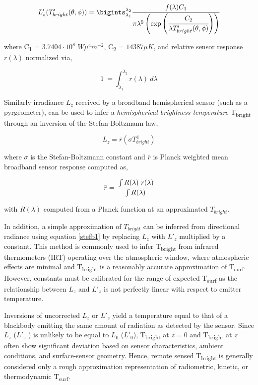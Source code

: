 \begin{equation}
L'_z(T'_{bright} (\theta, \phi)) = \bigints_{\lambda_1}^{\lambda_2} \cfrac{f(\lambda) C_1}{\pi \lambda^5 \left( \exp\left(\cfrac{C_2}{\lambda T'_{bright} (\theta, \phi)}\right)\right)}
\end{equation}

\noindent where C\textsubscript{1} = $ 3.7404 \cdot 10^8 $ $ W\mu^4 m^{-2} $, C\textsubscript{2} = $ 14387 \mu K $, and relative sensor response $ r(\lambda) $ normalized via,

\begin{equation}
1 ~ =  \int_{\lambda_1}^{\lambda_2} r(\lambda) ~ d\lambda
\end{equation}

Similarly irradiance $L_z$ received by a broadband hemispherical sensor (such as a pyrgeometer), can be used to infer a \textit{hemispherical brightness temperature} T\textsubscript{bright} through an inversion of the Stefan-Boltzmann law,

\begin{equation}
\label{stefb1}
L_z = \overline{r} (\sigma T_{bright}^4)
\end{equation}

\noindent where $ \sigma $ is the Stefan-Boltzmann constant and $ \overline{r} $ is Planck weighted mean broadband sensor response computed as,

\begin{equation}
\overline{r} = \cfrac{\int R(\lambda) ~ r(\lambda)}{\int R(\lambda)}
\end{equation}

\noindent with $ R(\lambda) $ computed from a Planck function at an approximated $T_{bright}$. 

In addition, a simple approximation of $T_{bright}$ can be inferred from directional radiance using equation \ref{stefb1} by replacing $ L_z $ with $L'_z$ multiplied by a constant. This method is commonly used to infer T\textsubscript{bright} from infrared thermometers (IRT) operating over the atmospheric window, where atmospheric effects are minimal and T\textsubscript{bright} is a reasonably accurate approximation of T\textsubscript{surf}. However, constants must be calibrated for the range of expected T\textsubscript{surf} as the relationship between $ L_z $ and $L'_z$  is not perfectly linear with respect to emitter temperature.

Inversions of uncorrected $ L_z $ or $L'_z$ yield a temperature equal to that of a blackbody emitting the same amount of radiation as detected by the sensor. Since $ L_z $ ($L'_z$ ) is unlikely to be equal to $ L_0 $ ($L'_0$), T\textsubscript{bright} at $ z = 0 $ and T\textsubscript{bright} at $ z $ often show significant deviation based on sensor characteristics, ambient conditions, and surface-sensor geometry. Hence, remote sensed T\textsubscript{bright} is generally considered only a rough approximation representation of radiometric, kinetic, or thermodynamic T\textsubscript{surf}. 

